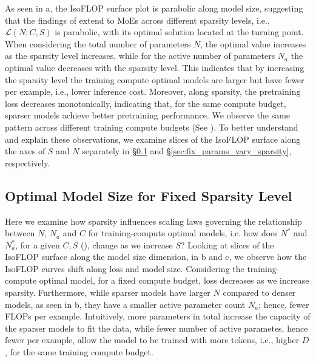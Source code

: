 As seen in a, the IsoFLOP surface plot is parabolic along model size, suggesting that the findings of \citet{hoffmann2022training} extend to MoEs across different sparsity levels, i.e., \( \mathcal{L}(N; C, S) \) is parabolic, with its optimal solution located at the turning point. When considering the total number of parameters $N$, the optimal value increases as the sparsity level increases, while for the active number of parameters $N_a$ the optimal value decreases with the sparsity level. This indicates that by increasing the sparsity level the training compute optimal models are larger but have fewer \flops per example, i.e., lower inference cost. 
Moreover, along sparsity, the pretraining loss decreases monotonically, indicating that, for the same compute budget, sparser models achieve better pretraining performance. We observe the same pattern across different training compute budgets (See ). To better understand and explain these observations, we examine slices of the IsoFLOP surface along the axes of \( S \) and \( N \) separately in \S\ref{sec:fix_sparsity_vary_params} and \S\ref{sec:fix_params_vary_sparsity}, respectively.

\subsection{Optimal Model Size for Fixed Sparsity Level}
\label{sec:fix_sparsity_vary_params}

Here we examine how sparsity influences scaling laws governing the relationship between \( N \), \(N_a\) and \( C \) for training-compute optimal models, i.e. how does \( N^* \) and \( N_a^* \), for a given $C,S$ 
(), change as we increase \( S \)?
Looking at slices of the IsoFLOP surface along the model size dimension, in b and c, we observe how the IsoFLOP curves shift along loss and model size. 
Considering the training-compute optimal model, for a fixed compute budget, loss decreases as we increase sparsity. Furthermore, while sparser models have larger \( N \) compared to denser models, as seen in b, they have a smaller active parameter count \( N_a \); hence, fewer FLOPs per example. Intuitively, more parameters in total increase the capacity of the sparser models to fit the data, while fewer number of active parametes, hence fewer \flops per example, allow the model to be trained with more tokens, i.e., higher \( D \), for the same training compute budget. 

